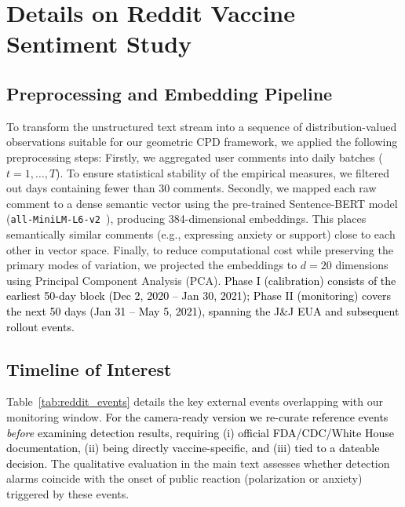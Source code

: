 \documentclass{article}
\newcommand{\rev}[1]{\textcolor{black}{#1}}
\theoremstyle{plain}
\theoremstyle{definition}
\theoremstyle{remark}
\begin{document}
\section{Details on Reddit Vaccine Sentiment Study}
\label{app:case:reddit}

\subsection{Preprocessing and Embedding Pipeline}
To transform the unstructured text stream into a sequence of distribution-valued observations suitable for our geometric CPD framework, we applied the following preprocessing steps:
Firstly, we aggregated user comments into daily batches ($t=1, \dots, T$). To ensure statistical stability of the empirical measures, we filtered out days containing fewer than 30 comments.
Secondly, we mapped each raw comment to a dense semantic vector using the pre-trained Sentence-BERT model (\texttt{all-MiniLM-L6-v2}~\citep{reimers2019sentence}), producing 384-dimensional embeddings. This places semantically similar comments (e.g., expressing anxiety or support) close to each other in vector space.
Finally, to reduce computational cost while preserving the primary modes of variation, we projected the embeddings to $d=20$ dimensions using Principal Component Analysis (PCA).
\rev{Phase I (calibration) consists of the earliest 50-day block (Dec 2, 2020 -- Jan 30, 2021); Phase II (monitoring) covers the next 50 days (Jan 31 -- May 5, 2021), spanning the J\&J EUA and subsequent rollout events.}


\subsection{Timeline of Interest}
Table~\ref{tab:reddit_events} details the key external events overlapping with our monitoring window. \rev{For the camera-ready version we re-curate reference events \emph{before} examining detection results, requiring (i) official FDA/CDC/White House documentation, (ii) being directly vaccine-specific, and (iii) tied to a dateable decision.} The qualitative evaluation in the main text assesses whether detection alarms coincide with the onset of public reaction (polarization or anxiety) triggered by these events.
\end{document}
